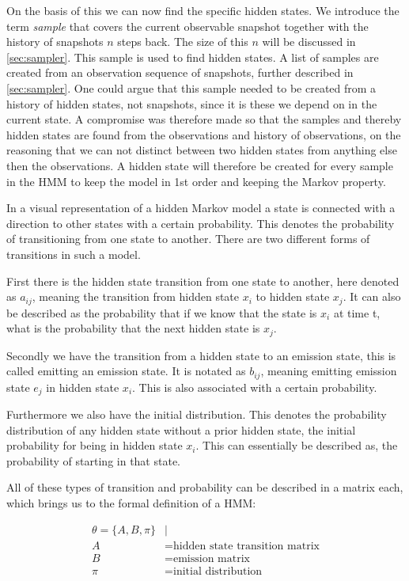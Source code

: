 On the basis of this we can now find the specific hidden states. We introduce the term \emph{sample} that covers the current observable snapshot together with the history of snapshots $n$ steps back. The size of this $n$ will be discussed in \cref{sec:sampler}. This sample is used to find hidden states. A list of samples are created from an observation sequence of snapshots, further described in \cref{sec:sampler}. One could argue that this sample needed to be created from a history of hidden states, not snapshots, since it is these we depend on in the current state. A compromise was therefore made so that the samples and thereby hidden states are found from the observations and history of observations, on the reasoning that we can not distinct between two hidden states from anything else then the observations. A hidden state will therefore be created for every sample in the HMM to keep the model in 1st order and keeping the Markov property.

In a visual representation of a hidden Markov model a state is connected with a direction to other states with a certain probability. This denotes the probability of transitioning from one state to another. There are two different forms of transitions in such a model.

First there is the hidden state transition from one state to another, here denoted as $a_{ij}$, meaning the transition from hidden state $x_i$ to hidden state $x_j$. It can also be described as the probability that if we know that the state is $x_i$ at time t, what is the probability that the next hidden state is $x_j$.

Secondly we have the transition from a hidden state to an emission state, this is called emitting an emission state. It is notated as $b_{ij}$, meaning emitting emission state $e_j$ in hidden state $x_i$. This is also associated with a certain probability.

Furthermore we also have the initial distribution. This denotes the probability distribution of any hidden state without a prior hidden state, the initial probability for being in hidden state $x_i$. This can essentially be described as, the probability of starting in that state.

All of these types of transition and probability can be described in a matrix each, which brings us to the formal definition of a HMM:

\begin{align*}
\theta = \{A,B,\pi\} &|\\
A &= \text{hidden state transition matrix}\\
B &= \text{emission matrix}\\
\pi &= \text{initial distribution}
\end{align*}

